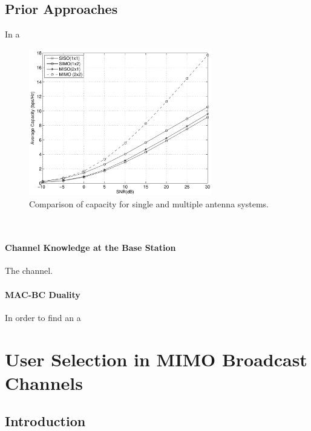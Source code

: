 \documentclass[a4paper,twoside,phd]{BYUPhys}
\begin{document}
\section{Prior Approaches}
\label{sec:CapResultsReview}

In a

\begin{figure}[t]
\centering
\includegraphics[width=8cm]{cap1}
\caption{Comparison of capacity for single and multiple antenna systems.}
\label{fig:cap1}
\end{figure}

\

\subsubsection{Channel Knowledge at the Base Station}

The channel.

\subsubsection{MAC-BC Duality}

In order to find an a
\chapter{User Selection in MIMO Broadcast Channels}
\label{chap:singleuser}

\section{Introduction \label{sec:Intro-ChapUserSelec}}
\end{document}
